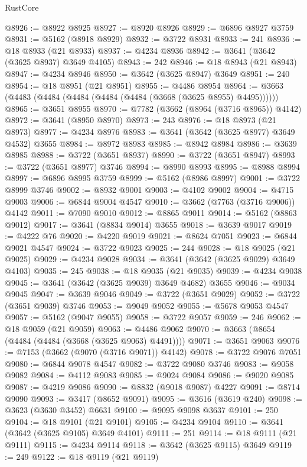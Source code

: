 \begin{lexlean}{RustCore}
\begin{coremodule}
@8926 := @8922 @8925
@8927 := @8920 @8926
@8929 := @6896 @8927 @3759
@8931 := @5162 (@8918 @8929)
@8932 := @3722 @8931
@8933 := 241
@8936 := @18 @8933 (@21 @8933)
@8937 := @4234 @8936
@8942 := @3641 (@3642 (@3625 @8937) @3649 @4105)
@8943 := 242
@8946 := @18 @8943 (@21 @8943)
@8947 := @4234 @8946
@8950 := @3642 (@3625 @8947) @3649
@8951 := 240
@8954 := @18 @8951 (@21 @8951)
@8955 := @4486 @8954
@8964 := @3663 (@4483 (@4484 (@4484 (@4484 (@4484 (@3668 (@3625 @8955) @4495))))))
@8965 := @3651 @8955
@8970 := @7782 (@3662 (@8964 (@3716 @8965)) @4142)
@8972 := @3641 (@8950 @8970)
@8973 := 243
@8976 := @18 @8973 (@21 @8973)
@8977 := @4234 @8976
@8983 := @3641 (@3642 (@3625 @8977) @3649 @4532) @3655
@8984 := @8972 @8983
@8985 := @8942 @8984
@8986 := @3639 @8985
@8988 := @3722 (@3651 @8937)
@8990 := @3722 (@3651 @8947)
@8993 := @3722 (@3651 @8977) @3746
@8994 := @8990 @8993
@8995 := @8988 @8994
@8997 := @6896 @8995 @3759
@8999 := @5162 (@8986 @8997)
@9001 := @3722 @8999 @3746
@9002 := @8932 @9001
@9003 := @4102 @9002
@9004 := @4715 @9003
@9006 := @6844 @9004 @4547
@9010 := @3662 (@7763 (@3716 @9006)) @4142
@9011 := @7090 @9010
@9012 := @8865 @9011
@9014 := @5162 (@8863 @9012)
@9017 := @3641 (@8834 @9014) @3655
@9018 := @3639 @9017
@9019 := @4222 @76
@9020 := @4220 @9019
@9021 := @8624 @7051
@9023 := @6844 @9021 @4547
@9024 := @3722 @9023
@9025 := 244
@9028 := @18 @9025 (@21 @9025)
@9029 := @4234 @9028
@9034 := @3641 (@3642 (@3625 @9029) @3649 @4103)
@9035 := 245
@9038 := @18 @9035 (@21 @9035)
@9039 := @4234 @9038
@9045 := @3641 (@3642 (@3625 @9039) @3649 @4682) @3655
@9046 := @9034 @9045
@9047 := @3639 @9046
@9049 := @3722 (@3651 @9029)
@9052 := @3722 (@3651 @9039) @3746
@9053 := @9049 @9052
@9055 := @5678 @9053 @4547
@9057 := @5162 (@9047 @9055)
@9058 := @3722 @9057
@9059 := 246
@9062 := @18 @9059 (@21 @9059)
@9063 := @4486 @9062
@9070 := @3663 (@8654 (@4484 (@4484 (@3668 (@3625 @9063) @4491))))
@9071 := @3651 @9063
@9076 := @7153 (@3662 (@9070 (@3716 @9071)) @4142)
@9078 := @3722 @9076 @7051
@9080 := @6844 @9078 @4547
@9082 := @3722 @9080 @3746
@9083 := @9058 @9082
@9084 := @4112 @9083
@9085 := @9024 @9084
@9086 := @9020 @9085
@9087 := @4219 @9086
@9090 := @8832 (@9018 @9087) @4227
@9091 := @8714 @9090
@9093 := @3417 (@8652 @9091)
@9095 := @3616 (@3619 @240)
@9098 := @3623 (@3630 @3452) @6631
@9100 := @9095 @9098 @3637
@9101 := 250
@9104 := @18 @9101 (@21 @9101)
@9105 := @4234 @9104
@9110 := @3641 (@3642 (@3625 @9105) @3649 @4101)
@9111 := 251
@9114 := @18 @9111 (@21 @9111)
@9115 := @4234 @9114
@9118 := @3642 (@3625 @9115) @3649
@9119 := 249
@9122 := @18 @9119 (@21 @9119)

\end{coremodule}
\end{lexlean}
